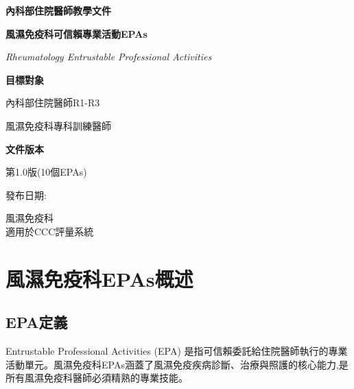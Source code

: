 \documentclass[12pt,a4paper]{article}
\newcommand{\mydate}{\DTMtoday}
\begin{document}
\begin{titlepage}
    \centering
    {\LARGE\textcolor{rheum_purple}{\textbf{內科部住院醫師教學文件}}\par}
    \vspace{1cm}
    {\huge\bfseries 風濕免疫科可信賴專業活動EPAs\par}
    \vspace{0.5cm}
    {\Large\textcolor{rheum_blue}{\textit{Rheumatology Entrustable Professional Activities}}\par}
    \vspace{1cm}
    
    \begin{tcolorbox}[
        colback=rheum_blue!5!white,
        colframe=rheum_blue,
        width=0.8\textwidth,
        arc=10pt,
        boxrule=1pt
    ]
    \centering
    {\large\textbf{目標對象}\par}
    \vspace{0.3cm}
    內科部住院醫師R1-R3\par
    風濕免疫科專科訓練醫師\par
    \vspace{0.5cm}
    {\large\textbf{文件版本}\par}
    \vspace{0.3cm}
    第1.0版(10個EPAs)\par
    發布日期:\mydate\par
    \end{tcolorbox}

    \vfill
    
    {\large 風濕免疫科  \\
    適用於CCC評量系統\par}
    
    \vspace{0.5cm}
\end{titlepage}

\newpage
\tableofcontents
\newpage

\section{風濕免疫科EPAs概述}

\subsection{EPA定義}
Entrustable Professional Activities (EPA) 是指可信賴委託給住院醫師執行的專業活動單元。風濕免疫科EPAs涵蓋了風濕免疫疾病診斷、治療與照護的核心能力,是所有風濕免疫科醫師必須精熟的專業技能。
\end{document}
